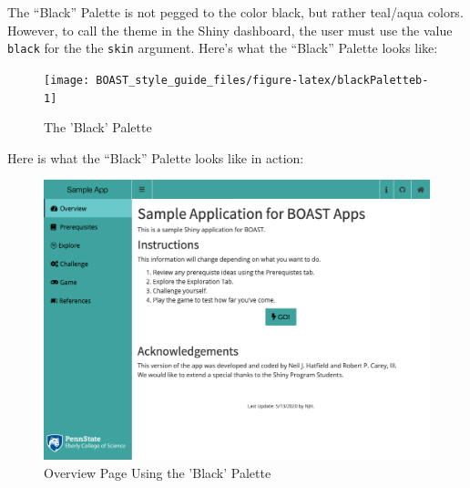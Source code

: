 \documentclass[
]{book}
\begin{document}
The ``Black'' Palette is not pegged to the color black, but rather teal/aqua colors. However, to call the theme in the Shiny dashboard, the user must use the value \texttt{black} for the the \texttt{skin} argument. Here's what the ``Black'' Palette looks like:

\begin{figure}

{\centering \texttt{[image: BOAST\_style\_guide\_files/figure-latex/blackPaletteb-1]} 

}

\caption{The 'Black' Palette}\label{fig:blackPaletteb}
\end{figure}

Here is what the ``Black'' Palette looks like in action:

\begin{figure}

{\centering \includegraphics[width=14in]{images/colorThemes/blackOverview} 

}

\caption{Overview Page Using the 'Black' Palette}\label{fig:blackAction1b}
\end{figure}
\end{document}
